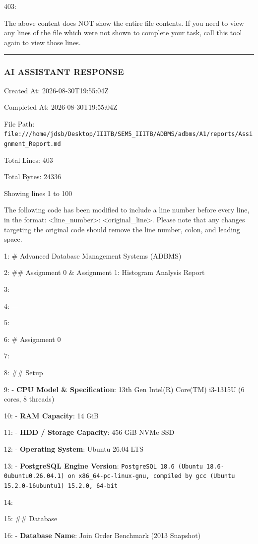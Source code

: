 \documentclass[11pt,a4paper]{article}
\begin{document}
{403:

The above content does NOT show the entire file contents. If you need to view any lines of the file which were not shown to complete your task, call this tool again to view those lines.


\hrule

\subsubsection{AI ASSISTANT RESPONSE}

Created At: 2026-08-30T19:55:04Z

Completed At: 2026-08-30T19:55:04Z

File Path: \texttt{file:///home/jdsb/Desktop/IIITB/SEM5\_IIITB/ADBMS/adbms/A1/reports/Assignment\_Report.md}

Total Lines: 403

Total Bytes: 24336

Showing lines 1 to 100

The following code has been modified to include a line number before every line, in the format: <line\_number>: <original\_line>. Please note that any changes targeting the original code should remove the line number, colon, and leading space.

1: \# Advanced Database Management Systems (ADBMS)

2: \#\# Assignment 0 \& Assignment 1: Histogram Analysis Report

3:

4: ---

5:

6: \# Assignment 0

7:

8: \#\# Setup

9: - \textbf{CPU Model \& Specification}: 13th Gen Intel(R) Core(TM) i3-1315U (6 cores, 8 threads)

10: - \textbf{RAM Capacity}: 14 GiB

11: - \textbf{HDD / Storage Capacity}: 456 GiB NVMe SSD

12: - \textbf{Operating System}: Ubuntu 26.04 LTS

13: - \textbf{PostgreSQL Engine Version}: \texttt{PostgreSQL 18.6 (Ubuntu 18.6-0ubuntu0.26.04.1) on x86\_64-pc-linux-gnu, compiled by gcc (Ubuntu 15.2.0-16ubuntu1) 15.2.0, 64-bit}

14:

15: \#\# Database

16: - \textbf{Database Name}: Join Order Benchmark (2013 Snapshot)

}
\end{document}
